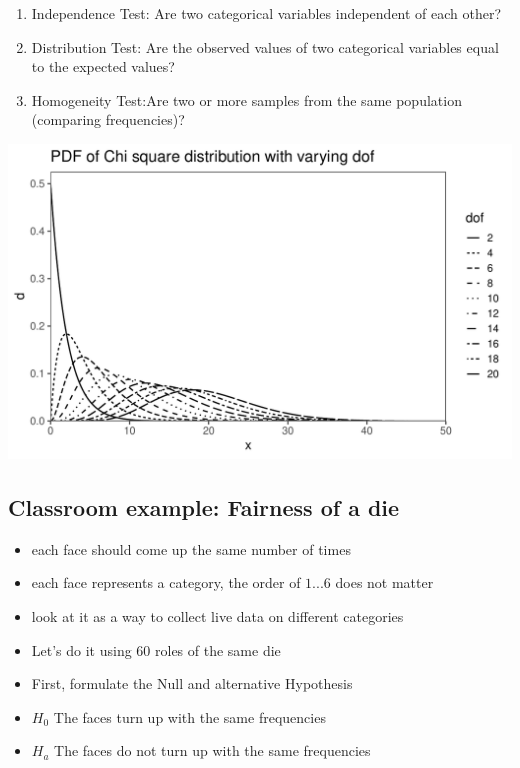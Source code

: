 \documentclass[
  a4paper,
]{scrbook}
\providecommand{\tightlist}{%
  \setlength{\itemsep}{0pt}\setlength{\parskip}{0pt}}\usepackage{longtable,booktabs,array}
\begin{document}
\begin{enumerate}
\def\labelenumi{\arabic{enumi}.}
\tightlist
\item
  Independence Test: Are two categorical variables independent of each
  other?
\item
  Distribution Test: Are the observed values of two categorical
  variables equal to the expected values?
\item
  Homogeneity Test:Are two or more samples from the same population
  (comparing frequencies)?
\end{enumerate}

\includegraphics[width=1\linewidth,height=\textheight,keepaspectratio]{chapter001_Distributions_files/figure-pdf/unnamed-chunk-7-1.pdf}

\subsection{Classroom example: Fairness of a
die}\label{classroom-example-fairness-of-a-die}

\begin{itemize}
\tightlist
\item
  each face should come up the same number of times
\item
  each face represents a category, the order of \(1 ... 6\) does not
  matter
\item
  look at it as a way to collect live data on different categories
\item
  Let's do it using 60 roles of the same die
\item
  First, formulate the Null and alternative Hypothesis
\end{itemize}

\begin{itemize}
\tightlist
\item
  \(H_0\) The faces turn up with the same frequencies
\item
  \(H_a\) The faces do not turn up with the same frequencies
\end{itemize}
\end{document}
